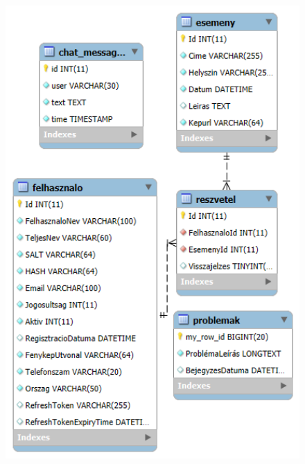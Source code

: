 \documentclass[colorlinks]{thesis-kando}
\theoremstyle{definition}
\theoremstyle{remark}
\begin{document}
%
\begin{figure}[bt]
	\begin{center}
		\includegraphics[width=1\textwidth]{tabla.png}
	\end{center}
	\end {figure}
\end{document}
